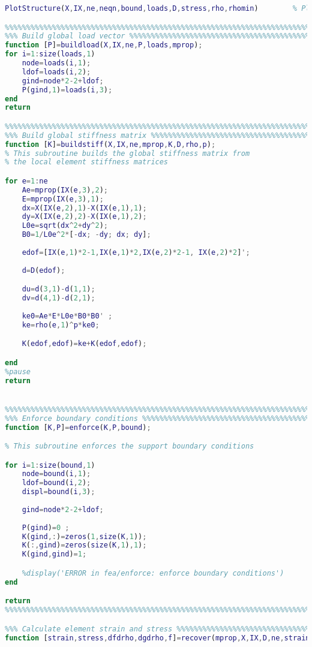 \begin{lstlisting}[language=Matlab, caption = FE implementation for topology optimization, label=lst:CodeTopo]
%--- Plot results --------------------------------------------------------%                                                        
PlotStructure(X,IX,ne,neqn,bound,loads,D,stress,rho,rhomin)        % Plot structure

%%%%%%%%%%%%%%%%%%%%%%%%%%%%%%%%%%%%%%%%%%%%%%%%%%%%%%%%%%%%%%%%%%%%%%%%%%%
%%% Build global load vector %%%%%%%%%%%%%%%%%%%%%%%%%%%%%%%%%%%%%%%%%%%%%%
function [P]=buildload(X,IX,ne,P,loads,mprop);
for i=1:size(loads,1)
    node=loads(i,1);
    ldof=loads(i,2);
    gind=node*2-2+ldof;
    P(gind,1)=loads(i,3);
end
return

%%%%%%%%%%%%%%%%%%%%%%%%%%%%%%%%%%%%%%%%%%%%%%%%%%%%%%%%%%%%%%%%%%%%%%%%%%%
%%% Build global stiffness matrix %%%%%%%%%%%%%%%%%%%%%%%%%%%%%%%%%%%%%%%%%
function [K]=buildstiff(X,IX,ne,mprop,K,D,rho,p);
% This subroutine builds the global stiffness matrix from
% the local element stiffness matrices

for e=1:ne
    Ae=mprop(IX(e,3),2);
    E=mprop(IX(e,3),1);
    dx=X(IX(e,2),1)-X(IX(e,1),1);
    dy=X(IX(e,2),2)-X(IX(e,1),2);
    L0e=sqrt(dx^2+dy^2);
    B0=1/L0e^2*[-dx; -dy; dx; dy];
    
    edof=[IX(e,1)*2-1,IX(e,1)*2,IX(e,2)*2-1, IX(e,2)*2]';
    
    d=D(edof);

    du=d(3,1)-d(1,1);
    dv=d(4,1)-d(2,1);   
    
    ke0=Ae*E*L0e*B0*B0' ;
    ke=rho(e,1)^p*ke0;

    K(edof,edof)=ke+K(edof,edof);

end
%pause
return


%%%%%%%%%%%%%%%%%%%%%%%%%%%%%%%%%%%%%%%%%%%%%%%%%%%%%%%%%%%%%%%%%%%%%%%%%%%
%%% Enforce boundary conditions %%%%%%%%%%%%%%%%%%%%%%%%%%%%%%%%%%%%%%%%%%%
function [K,P]=enforce(K,P,bound);

% This subroutine enforces the support boundary conditions

for i=1:size(bound,1)
    node=bound(i,1);
    ldof=bound(i,2);
    displ=bound(i,3);
    
    gind=node*2-2+ldof;
    
    P(gind)=0 ;
    K(gind,:)=zeros(1,size(K,1));
    K(:,gind)=zeros(size(K,1),1);
    K(gind,gind)=1;

    %display('ERROR in fea/enforce: enforce boundary conditions')
end

return
%%%%%%%%%%%%%%%%%%%%%%%%%%%%%%%%%%%%%%%%%%%%%%%%%%%%%%%%%%%%%%%%%%%%%%%%%%%

%%% Calculate element strain and stress %%%%%%%%%%%%%%%%%%%%%%%%%%%%%%%%%%%
function [strain,stress,dfdrho,dgdrho,f]=recover(mprop,X,IX,D,ne,strain,stress,rho,v,Vstar,p);


\end{lstlisting}
